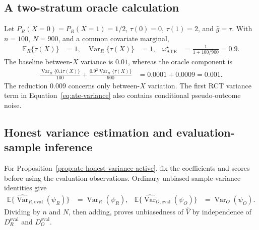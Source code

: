 \subsection{A two-stratum oracle calculation}

Let $P_R(X=0)=P_R(X=1)=1/2$, $\tau(0)=0$, $\tau(1)=2$, and $\widehat{g}=\tau$. With $n=100$, $N=900$, and a common covariate marginal,
\begin{align*}
\mathbb E_R\{\tau(X)\}&=1,
&
\operatorname{Var}_R\{\tau(X)\}&=1,
&
\omega_{\mathrm{ATE}}^\star&=\frac{1}{1+100/900}=0.9.
\end{align*}
The baseline between-$X$ variance is $0.01$, whereas the oracle component is
\begin{align*}
\frac{\operatorname{Var}_R\{0.1\tau(X)\}}{100}
+\frac{0.9^2\operatorname{Var}_R\{\tau(X)\}}{900}
&=0.0001+0.0009=0.001.
\end{align*}
The reduction $0.009$ concerns only between-$X$ variation. The first RCT
variance term in Equation~\eqref{eq:ate-variance} also contains conditional
pseudo-outcome noise.

\subsection{Honest variance estimation and evaluation-sample inference}
\label{app:ate-evaluation-regularity}

For Proposition~\ref{prop:ate-honest-variance-active}, fix the coefficients and
scores before using the evaluation observations. Ordinary unbiased sample-variance identities
give
\begin{align*}
\mathbb E\{\widehat{\operatorname{Var}}_{R,\mathrm{eval}}(\psi_R)\}
&=\operatorname{Var}_R(\psi_R),
&
\mathbb E\{\widehat{\operatorname{Var}}_{O,\mathrm{eval}}(\psi_O)\}
&=\operatorname{Var}_O(\psi_O).
\end{align*}
Dividing by $n$ and $N$, then adding, proves unbiasedness of
$\widehat V$ by independence of $D_R^{\mathrm{eval}}$ and
$D_O^{\mathrm{eval}}$.

